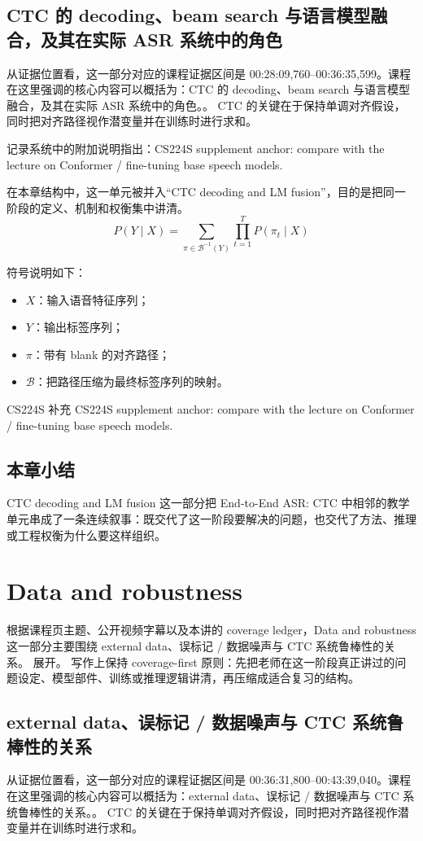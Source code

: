 \documentclass[a4paper]{article}
\begin{document}
\subsection{CTC 的 decoding、beam search 与语言模型融合，及其在实际 ASR 系统中的角色}
从证据位置看，这一部分对应的课程证据区间是 00:28:09,760--00:36:35,599。课程在这里强调的核心内容可以概括为：CTC 的 decoding、beam search 与语言模型融合，及其在实际 ASR 系统中的角色。。
CTC 的关键在于保持单调对齐假设，同时把对齐路径视作潜变量并在训练时进行求和。

记录系统中的附加说明指出：CS224S supplement anchor: compare with the lecture on Conformer / fine-tuning base speech models.

在本章结构中，这一单元被并入“CTC decoding and LM fusion”，目的是把同一阶段的定义、机制和权衡集中讲清。
\[
P(Y \mid X) = \sum_{\pi \in \mathcal{B}^{-1}(Y)} \prod_{t=1}^{T} P(\pi_t \mid X)
\]

符号说明如下：
\begin{itemize}
\item $X$：输入语音特征序列；
\item $Y$：输出标签序列；
\item $\pi$：带有 blank 的对齐路径；
\item $\mathcal{B}$：把路径压缩为最终标签序列的映射。
\end{itemize}
\begin{knowledgebox}{CS224S 补充}
CS224S supplement anchor: compare with the lecture on Conformer / fine-tuning base speech models.
\end{knowledgebox}

\subsection{本章小结}
CTC decoding and LM fusion 这一部分把 End-to-End ASR: CTC 中相邻的教学单元串成了一条连续叙事：既交代了这一阶段要解决的问题，也交代了方法、推理或工程权衡为什么要这样组织。

\section{Data and robustness}
根据课程页主题、公开视频字幕以及本讲的 coverage ledger，Data and robustness 这一部分主要围绕 external data、误标记 / 数据噪声与 CTC 系统鲁棒性的关系。 展开。
写作上保持 coverage-first 原则：先把老师在这一阶段真正讲过的问题设定、模型部件、训练或推理逻辑讲清，再压缩成适合复习的结构。

\subsection{external data、误标记 / 数据噪声与 CTC 系统鲁棒性的关系}
从证据位置看，这一部分对应的课程证据区间是 00:36:31,800--00:43:39,040。课程在这里强调的核心内容可以概括为：external data、误标记 / 数据噪声与 CTC 系统鲁棒性的关系。。
CTC 的关键在于保持单调对齐假设，同时把对齐路径视作潜变量并在训练时进行求和。
\end{document}
